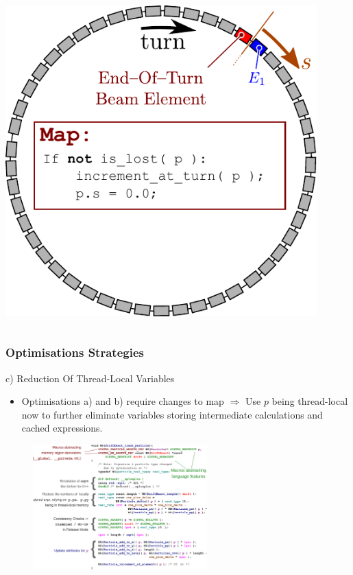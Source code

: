 \documentclass{beamer}
\begin{document}
\begin{frame}
\begin{columns}
\begin{column}{0.4\textwidth}
    \includegraphics[width=0.9\textwidth]{poster_images/fig_tracking_algorithm_optimisation}
\end{column}
\end{columns}
\end{frame}

\begin{frame}
    \frametitle{Optimisations Strategies}
    {c) Reduction Of Thread-Local Variables}\\[0.4em]
    \begin{itemize}
        \item Optimisations { a) and b)} require changes to map $\Rightarrow$\newline
              Use $p$ being thread-local now to further eliminate variables storing intermediate calculations and cached expressions.
    \end{itemize}
    \begin{figure}[H]
        \centering
        \includegraphics[width=0.6\textwidth]{poster_images/fig_map_drift_exact_optimisation}
    \end{figure}
\end{frame}
\end{document}
